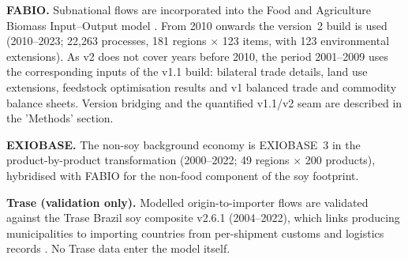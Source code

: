 \documentclass[pdflatex,sn-nature]{sn-jnl}%
\begin{document}
\textbf{FABIO.} Subnational flows are incorporated into the Food and Agriculture
Biomass Input--Output model \cite{bruckner2019fabio}. From 2010 onwards the
version~2 build is used (2010--2023; 22{,}263 processes, 181 regions
$\times$ 123 items, with 123 environmental extensions). As v2 does not cover years before 2010, the period 2001–2009 uses the corresponding inputs of the v1.1 build: bilateral trade details, land use extensions, feedstock optimisation results and v1 balanced trade and commodity balance sheets. Version bridging and the quantified v1.1/v2 seam are described in the 'Methods' section.

\textbf{EXIOBASE.} The non-soy background economy is EXIOBASE~3
\cite{stadler2018exiobase} in the product-by-product transformation
(2000--2022; 49 regions $\times$ 200 products), hybridised with FABIO for
the non-food component of the soy footprint.

\textbf{Trase (validation only).} Modelled origin-to-importer flows are
validated against the Trase Brazil soy composite v2.6.1 (2004--2022), which
links producing municipalities to importing countries from per-shipment
customs and logistics records \cite{godar2015sei,escobar2020trase}. No
Trase data enter the model itself.
\end{document}

